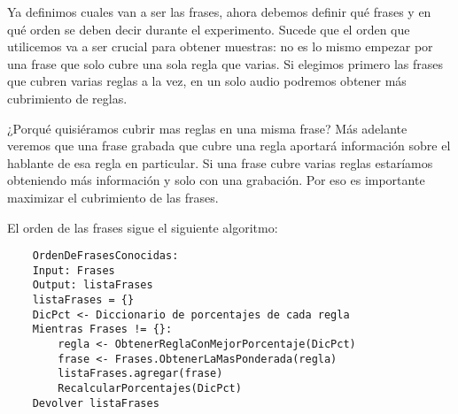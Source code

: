 Ya definimos cuales van a ser las frases, ahora debemos definir qué frases y en qué orden se deben decir durante el experimento. Sucede que el orden que utilicemos va a ser crucial para obtener muestras: no es lo mismo empezar por una frase que solo cubre una sola regla que varias. Si elegimos primero las frases que cubren varias reglas a la vez, en un solo audio podremos obtener más cubrimiento de reglas. 

¿Porqué quisiéramos cubrir mas reglas en una misma frase? Más adelante veremos que una frase grabada que cubre una regla aportará información sobre el hablante de esa regla en particular. Si una frase cubre varias reglas estaríamos obteniendo más información y solo con una grabación. Por eso es importante maximizar el cubrimiento de las frases.  

El orden de las frases sigue el siguiente algoritmo:

\begin{lstlisting}
    OrdenDeFrasesConocidas:
    Input: Frases
    Output: listaFrases 
    listaFrases = {}
    DicPct <- Diccionario de porcentajes de cada regla
    Mientras Frases != {}:
    	regla <- ObtenerReglaConMejorPorcentaje(DicPct)
    	frase <- Frases.ObtenerLaMasPonderada(regla)
    	listaFrases.agregar(frase)
    	RecalcularPorcentajes(DicPct)
    Devolver listaFrases
\end{lstlisting}

